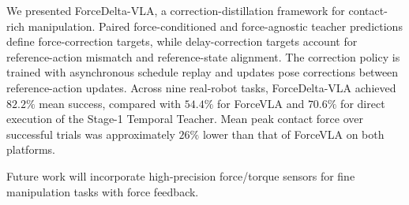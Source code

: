 We presented ForceDelta-VLA, a correction-distillation framework for contact-rich manipulation. Paired force-conditioned and force-agnostic teacher predictions define force-correction targets, while delay-correction targets account for reference-action mismatch and reference-state alignment. The correction policy is trained with asynchronous schedule replay and updates pose corrections between reference-action updates. Across nine real-robot tasks, ForceDelta-VLA achieved $82.2\%$ mean success, compared with $54.4\%$ for ForceVLA and $70.6\%$ for direct execution of the Stage-1 Temporal Teacher. Mean peak contact force over successful trials was approximately $26\%$ lower than that of ForceVLA on both platforms.

Future work will incorporate high-precision force/torque sensors for fine manipulation tasks with force feedback.
